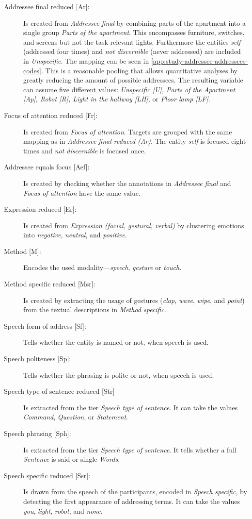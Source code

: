 \begin{description}
    \item[{Addressee final reduced [Ar]:}] Is created from \emph{Addressee final} by combining parts of the \gls{apartment} into a single group \emph{Parts of the apartment}.
    This encompasses furniture, switches, and screens but not the task relevant lights.
    Furthermore the entities \emph{self} (addressed four times) and \emph{not discernible} (never addressed) are included in \emph{Unspecific}.
    The mapping can be seen in \cref{app:study-addressee-addressees-codes}.
    This is a reasonable pooling that allows quantitative analyses by greatly reducing the amount of possible \glspl{addressee}.
    The resulting variable can assume five different values: \emph{Unspecific [U], Parts of the Apartment [Ap], Robot [R], Light in the hallway [LH], } or \emph{Floor lamp [LF]}.
    \item[{Focus of attention reduced [Fr]:}] Is created from \emph{Focus of attention}.
    Targets are grouped with the same mapping as in \emph{Addressee final reduced (Ar)}. 
    The entity \emph{self} is focused eight times and \emph{not discernible} is focused once.
    \item[{Addressee equals focus [Aef]:}] Is created by checking whether the annotations in \emph{Addressee final} and \emph{Focus of attention} have the same value.
    \item[{Expression reduced [Er]:}] Is created from \emph{Expression (facial, gestural, verbal)} by clustering emotions into \emph{negative}, \emph{neutral}, and \emph{positive}.
    \item[{Method [M]:}] Encodes the used modality---\emph{speech}, \emph{gesture} or \emph{touch}.
    \item[{Method specific reduced [Msr]:}] Is created by extracting the usage of gestures (\emph{clap}, \emph{wave}, \emph{wipe}, and \emph{point}) from the textual descriptions in \emph{Method specific}.
    \item[{Speech form of address [Sf]:}] Tells whether the entity is named or not, when speech is used.
    \item[{Speech politeness [Sp]:}] Tells whether the phrasing is polite or not, when speech is used.
    \item[{Speech type of sentence reduced [Str]}] Is extracted from the tier \emph{Speech type of sentence}.
    It can take the values \emph{Command}, \emph{Question}, or \emph{Statement}. 
    \item[{Speech phrasing [Sph]:}] Is extracted from the tier \emph{Speech type of sentence}.
    It tells whether a full \emph{Sentence} is said or single \emph{Words}.
    \item[{Speech specific reduced [Ssr]:}] Is drawn from the speech of the participants, encoded in \emph{Speech specific}, by detecting the first appearance of addressing terms.
    It can take the values \emph{you}, \emph{light}, \emph{robot}, and \emph{none}.
\end{description}
